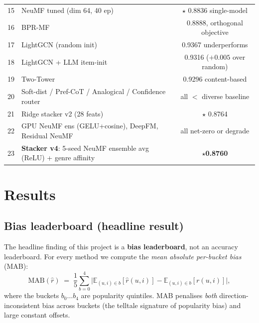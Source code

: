 \documentclass[11pt,a4paper]{article}
\newcommand{\best}[1]{\textcolor{goodgreen}{\textbf{#1}}}
\begin{document}
\begin{table}[H]
\begin{tabularx}{\linewidth}{rXc}
15 & NeuMF tuned (dim 64, 40 ep)                                                & $\star$ 0.8836 single-model \\
16 & BPR-MF                                                                      & 0.8888, orthogonal objective \\
17 & LightGCN (random init)                                                     & 0.9367 underperforms \\
18 & LightGCN + LLM item-init                                                   & 0.9316 ($+0.005$ over random) \\
19 & Two-Tower                                                                   & 0.9296 content-based \\
20 & Soft-dist / Pref-CoT / Analogical / Confidence router                      & all $<$ diverse baseline \\
21 & Ridge stacker v2 (28 feats)                                                & $\star$ 0.8764 \\
22 & GPU NeuMF ens (GELU+cosine), DeepFM, Residual NeuMF                        & all net-zero or degrade \\
23 & \textbf{Stacker v4}: 5-seed NeuMF ensemble avg (ReLU) + genre affinity     & $\star$\best{0.8760} \\
\bottomrule
\end{tabularx}
\end{table}

\section{Results}
\label{sec:results}

\subsection{Bias leaderboard (headline result)}

The headline finding of this project is a \textbf{bias leaderboard},
not an accuracy leaderboard.  For every method we compute the
\emph{mean absolute per-bucket bias} (MAB):
\[
  \text{MAB}(\hat{r}) \;=\;
  \frac{1}{5}\sum_{b=0}^{4}
  \bigl| \mathbb{E}_{(u,i)\in b}[\hat{r}(u,i)] - \mathbb{E}_{(u,i)\in b}[r(u,i)]\bigr|,
\]
where the buckets $b_0 {\dots} b_4$ are popularity quintiles.  MAB
penalises \emph{both} direction-inconsistent bias across buckets (the
telltale signature of popularity bias) and large constant offsets.
\end{document}
